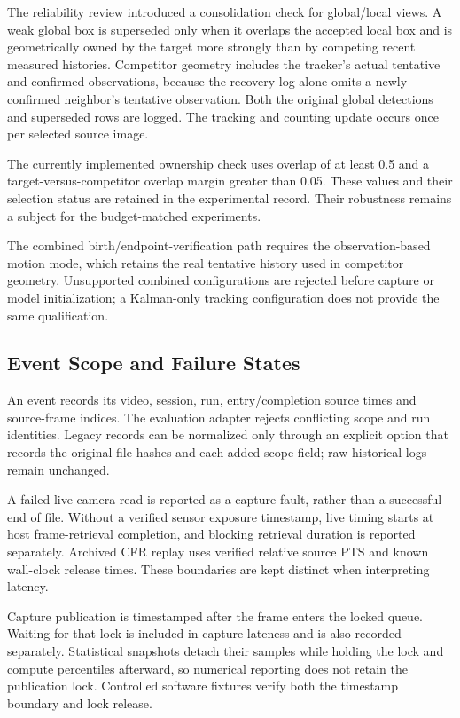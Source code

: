 \documentclass[journal]{IEEEtran}
\begin{document}
The reliability review introduced a consolidation check for global/local views. A weak global box is superseded only when it overlaps the accepted local box and is geometrically owned by the target more strongly than by competing recent measured histories. Competitor geometry includes the tracker's actual tentative and confirmed observations, because the recovery log alone omits a newly confirmed neighbor's tentative observation. Both the original global detections and superseded rows are logged. The tracking and counting update occurs once per selected source image.

The currently implemented ownership check uses overlap of at least 0.5 and a target-versus-competitor overlap margin greater than 0.05. These values and their selection status are retained in the experimental record. Their robustness remains a subject for the budget-matched experiments.

The combined birth/endpoint-verification path requires the observation-based motion mode, which retains the real tentative history used in competitor geometry. Unsupported combined configurations are rejected before capture or model initialization; a Kalman-only tracking configuration does not provide the same qualification.

\subsection{Event Scope and Failure States}
An event records its video, session, run, entry/completion source times and source-frame indices. The evaluation adapter rejects conflicting scope and run identities. Legacy records can be normalized only through an explicit option that records the original file hashes and each added scope field; raw historical logs remain unchanged.

A failed live-camera read is reported as a capture fault, rather than a successful end of file. Without a verified sensor exposure timestamp, live timing starts at host frame-retrieval completion, and blocking retrieval duration is reported separately. Archived CFR replay uses verified relative source PTS and known wall-clock release times. These boundaries are kept distinct when interpreting latency.

Capture publication is timestamped after the frame enters the locked queue. Waiting for that lock is included in capture lateness and is also recorded separately. Statistical snapshots detach their samples while holding the lock and compute percentiles afterward, so numerical reporting does not retain the publication lock. Controlled software fixtures verify both the timestamp boundary and lock release.
\end{document}
